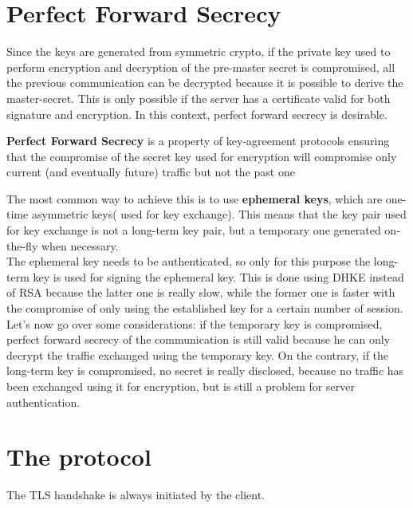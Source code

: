 \section{Perfect Forward Secrecy}
Since the keys are generated from symmetric crypto, if the private key
used to perform encryption and decryption of the pre-master secret is
compromised, all the previous communication can be decrypted because
it is possible to derive the master-secret. This is only possible if
the server has a certificate valid for both signature and encryption.
In this context, perfect forward secrecy is desirable.
\begin{boxH}
  \textbf{Perfect Forward Secrecy} is a property of key-agreement
  protocols ensuring that the compromise of the secret key used for
  encryption will compromise only current (and eventually future)
  traffic but not the past one
\end{boxH}
The most common way to achieve this is to use \textbf{ephemeral keys},
which are one-time asymmetric keys( used for key exchange). This means
that the key pair used for key exchange is not a long-term key pair,
but a temporary one generated on-the-fly when necessary.\\ 
The ephemeral key needs to be authenticated, so only for this purpose
the long-term key is used for signing the ephemeral key. This is done
using DHKE instead of RSA because the latter one is really slow, while
the former one is faster with the compromise of only using the
established key for a certain number of session.\\
Let's now go over some considerations: if the temporary key is
compromised, perfect forward secrecy of the communication is still
valid because he can only decrypt the traffic exchanged using the
temporary key. On the contrary, if the long-term key is compromised,
no secret is really disclosed, because no traffic has been exchanged
using it for encryption, but is still a problem for server
authentication.

\section{The protocol}
The TLS handshake is always initiated by the client. 

